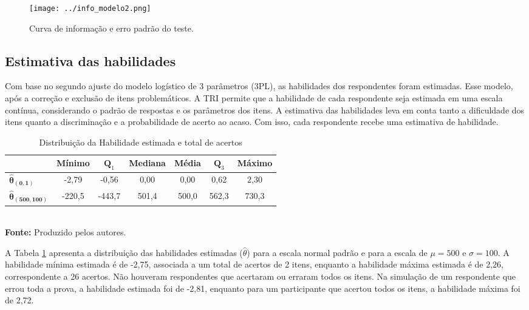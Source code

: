 \begin{figure}[H]
	\centering
	\caption{Curva de informação e erro padrão do teste.}
	\texttt{[image: ../info\_modelo2.png]}
	\parbox{\textwidth}{
		\centering %
	}
	\label{fig:info}
\end{figure}


\subsection{Estimativa das habilidades}

Com base no segundo ajuste do modelo logístico de 3 parâmetros (3PL), as habilidades dos respondentes foram estimadas. Esse modelo, após a correção e exclusão de itens problemáticos. A TRI permite que a habilidade  de cada respondente seja estimada em uma escala contínua, considerando o padrão de respostas e os parâmetros dos itens. A estimativa das habilidades leva em conta tanto a dificuldade dos itens quanto a discriminação e a probabilidade de acerto ao acaso. Com isso, cada respondente recebe uma estimativa de habilidade.



\begin{table}[H]		
	\centering
		\caption{Distribuição da Habilidade estimada e total de acertos}
		\label{summary-habilidade}
		\begin{tabular}{lcccccc}
			\hline
			& \textbf{Mínimo} & $\textbf{Q}_1$ & \textbf{Mediana} & \textbf{Média} & $\textbf{Q}_3$ & \textbf{Máximo} \\ 
			\hline
			$\boldsymbol{\hat{\theta}_{(0,1)}}$ & -2,79 & -0,56 & 0,00 & 0,00 & 0,62 & 2,30 \\ 
			\hline
			$\boldsymbol{\hat{\theta}_{(500,100)}}$ & -220,5 & -443,7 & 501,4 & 500,0 & 562,3 & 730,3 \\
			\hline
		\end{tabular}\\
		\vspace*{0.5cm}
		\small{\textbf{Fonte:} Produzido pelos autores.}
\end{table}

A Tabela \ref{summary-habilidade} apresenta a distribuição das habilidades estimadas ($\hat{\theta}$) para a escala normal padrão e para a escala  de $\mu = 500$ e $\sigma = 100$. A habilidade mínima estimada é de -2,75, associada a um total de acertos de 2 itens, enquanto a habilidade máxima estimada é de 2,26, correspondente a 26 acertos. Não houveram respondentes que acertaram ou erraram todos os itens. Na simulação de um respondente que errou toda a prova, a habilidade estimada foi de -2,81, enquanto para um participante que acertou todos os itens, a habilidade máxima foi de 2,72. 

